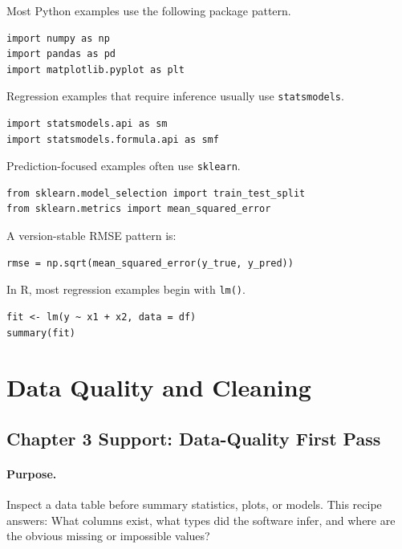 Most Python examples use the following package pattern.

\begin{verbatim}
import numpy as np
import pandas as pd
import matplotlib.pyplot as plt
\end{verbatim}

Regression examples that require inference usually use \texttt{statsmodels}.

\begin{verbatim}
import statsmodels.api as sm
import statsmodels.formula.api as smf
\end{verbatim}

Prediction-focused examples often use \texttt{sklearn}.

\begin{verbatim}
from sklearn.model_selection import train_test_split
from sklearn.metrics import mean_squared_error
\end{verbatim}

A version-stable RMSE pattern is:

\begin{verbatim}
rmse = np.sqrt(mean_squared_error(y_true, y_pred))
\end{verbatim}

In R, most regression examples begin with \texttt{lm()}.

\begin{verbatim}
fit <- lm(y ~ x1 + x2, data = df)
summary(fit)
\end{verbatim}

\section{Data Quality and Cleaning}
\label{app:cookbook-data-quality-cleaning}

\subsection{Chapter 3 Support: Data-Quality First Pass}
\label{app:ch03-software-cookbook-data-quality-first-pass}

\paragraph{Purpose.} Inspect a data table before summary statistics, plots, or models.  This recipe answers: What columns exist, what types did the software infer, and where are the obvious missing or impossible values?

